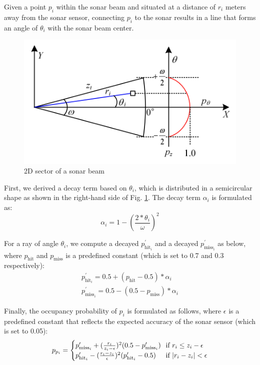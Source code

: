 Given a point $p_i$ within the sonar beam and situated at a distance of $r_i$ meters away from the sonar sensor, connecting $p_i$ to the sonar results in a line that forms an angle of $\theta_i$ with the sonar beam center.

\begin{figure}[h]
    \centering
    \includegraphics[width=0.5\columnwidth]{fig/sonar_model_2d.png}
    \caption{2D sector of a sonar beam}
    \label{fig:sim_sonar_2d}
\end{figure}

First, we derived a decay term based on $\theta_i$, which is distributed in a semicircular shape as shown in the right-hand side of Fig. \ref{fig:sim_sonar_2d}. The decay term $\alpha_i$ is formulated as:
\begin{equation}
    \alpha_{i} = 1 - (\frac{2 * \theta_i}{\omega})^2
\end{equation}

For a ray of angle $\theta_i$, we compute a decayed $p_{\text{hit}_i}^{\prime}$ and a decayed $p_{\text{miss}_i}^{\prime}$ as below, where $p_{\text{hit}}$ and $p_{\text{miss}}$ is a predefined constant (which is set to 0.7 and 0.3 respectively):
\begin{equation}
    \begin{split}
    p_{\text{hit}_i}^{\prime} = 0.5 + (p_{\text{hit}} - 0.5) * \alpha_{i} \\
    p_{\text{miss}_i}^{\prime} = 0.5 - (0.5 - p_{\text{miss}}) * \alpha_{i}
    \end{split}
\end{equation}

Finally, the occupancy probability of $p_i$ is formulated as follows, where $\epsilon$ is a predefined constant that reflects the expected accuracy of the sonar sensor (which is set to 0.05):
\begin{equation}
    p_{p_i} =
    \begin{cases}
      p_{\text{miss}_i}^{\prime} + (\frac{r_i}{z_i- \epsilon})^2(0.5 - p_{\text{miss}_i}^{\prime}) & \hspace{-3pt}\text{if $r_i \leq z_i- \epsilon$} \\
      p_{\text{hit}_i}^{\prime} - (\frac{r_i - z_i}{\epsilon})^2(p_{\text{hit}_i}^{\prime} - 0.5) & \hspace{-3pt}\text{if $|r_i - z_i| < \epsilon$}
    \end{cases}
\end{equation}

